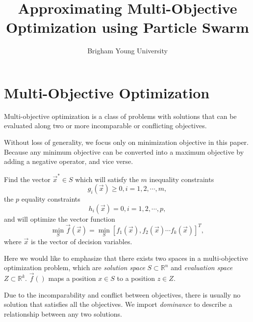\documentclass[12pt]{article}
\begin{document}
\title{\textsf{Approximating Multi-Objective Optimization using Particle Swarm}}
\date{\textsf{Brigham Young University}}

\maketitle

\section{Multi-Objective Optimization}

Multi-objective optimization is a class of problems with solutions that can be evaluated along two or more incomparable or conflicting objectives.

Without loss of generality, we focus only on minimization objective in this paper. 
Because any minimum objective can be converted into a maximum objective by adding a negative operator, and vice verse. 

\begin{mydef}
\label{def:multi_opt}
Find the vector $ \vec{x}^{*} \in S $ which will satisfy the $ m $ inequality constraints
\begin{equation}
\label{eq:mo_ineq_constraint}
g_{i}(\vec{x}) \geq 0, i = 1, 2, \cdots , m, 
\end{equation}
the $ p $ equality constraints
\begin{equation}
\label{eq:mo_eq_constraint}
h_{i}(\vec{x}) = 0, i = 1, 2, \cdots , p, 
\end{equation}
and will optimize the vector function
\begin{equation}
\label{eq:mo_obj}
\min_{ S } \vec{f}(\vec{x}) = \min_{ S } \left[ f_{1}(\vec{x}), f_{2}(\vec{x}) \cdots f_{k}(\vec{x}) \right]^{T},
\end{equation}
where $ \vec{x} $ is the vector of decision variables.
\end{mydef}

Here we would like to emphasize that there exists two spaces in a multi-objective optimization problem, which are
\emph{solution space} $ S \subset \mathbb{R}^{n}  $ and \emph{evaluation space} $ Z \subset \mathbb{R}^{k} $.
$ \vec{f}() $ maps a position $ x \in S $ to a position $ z \in Z $.

Due to the incomparability and conflict between objectives, there is usually no solution that satisfies all the objectives.
We import \emph{dominance} to describe a relationship between any two solutions.
\end{document}
